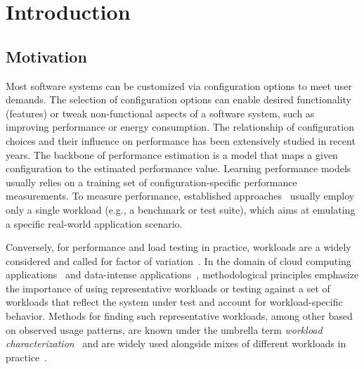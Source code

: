 \section{Introduction}
\subsection*{Motivation}
Most software systems can be customized via configuration options to meet user demands. The selection of configuration options can enable desired functionality (features) or tweak non-functional aspects of a software system, such as improving performance or energy consumption. 
The relationship of configuration choices and their influence on performance has been extensively studied in recent years.
The backbone of performance estimation is a model that maps a given configuration to the estimated performance value. 
Learning performance models usually relies on a training set of configuration-specific performance measurements. 
To measure performance, established approaches~\cite{dorn2020,siegmundPerformanceinfluenceModelsHighly2015,haDeepPerf2019,perfAL,guoVariabilityawarePerformancePrediction2013,sarkarCostEfficientSamplingPerformance,guo_2018_data,fourier_learning_2015,perLasso} usually employ only a single workload (e.g., a benchmark or test suite), which aims at emulating a specific real-world application scenario.

Conversely, for performance and load testing in practice, workloads are a widely considered and called for factor of variation~\cite{ceesay2020,papadopoulos2021}.
In the domain of cloud computing applications~\cite{papadopoulos2021} and data-intense applications~\cite{ceesay2020}, methodological principles emphasize the importance of using representative workloads or testing against a set of workloads that reflect the system under test and account for workload-specific behavior. Methods for finding such representative workloads, among other based on observed usage patterns, are known under the umbrella term \emph{workload characterization}~\cite{calzarossa2016} and are widely used alongside mixes of different workloads in practice~\cite{jiang2015survey}. 


